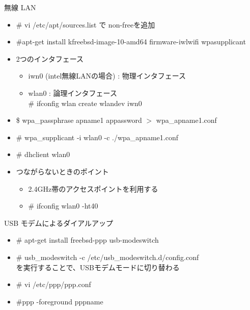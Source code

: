 \begin{frame}[containsverbatim]{無線 LAN}
  \begin{itemize}
  \item \# vi /etc/apt/sources.list で non-freeを追加    
  \item \#apt-get install kfreebsd-image-10-amd64 firmware-iwlwifi wpasupplicant
  \item 2つのインタフェース
    \begin{itemize}
    \item iwn0 (intel無線LANの場合) : 物理インタフェース
    \item wlan0 : 論理インタフェース \\
      \# ifconfig wlan create wlandev iwn0      
    \end{itemize}
  \item \$ wpa\_passphrase apname1 appassword $>$ wpa\_apname1.conf
  \item \# wpa\_supplicant -i wlan0 -c ./wpa\_apname1.conf
  \item \# dhclient wlan0
  \item つながらないときのポイント
    \begin{itemize}
    \item 2.4GHz帯のアクセスポイントを利用する
    \item \# ifconfig wlan0 -ht40
    \end{itemize}
  \end{itemize}
\end{frame}


\begin{frame}[containsverbatim]{USB モデムによるダイアルアップ}
  \begin{itemize}
  \item \# apt-get install freebsd-ppp usb-modeswitch
  \item \# usb\_modeswitch -c /etc/usb\_modeswitch.d/{config}.conf\\
    を実行することで、USBモデムモードに切り替わる
  \item \# vi /etc/ppp/ppp.conf
  \item \#ppp -foreground {pppname}
  \end{itemize}
\end{frame}


